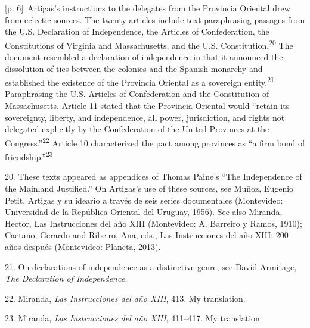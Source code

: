 \documentclass[10pt,a4paper]{article}
\begin{document}
{\scriptsize\color{gray} [p. 6]}\ Artigas’s instructions to the delegates from the Provincia Oriental drew from eclectic sources. The twenty articles include text paraphrasing passages from the U.S. Declaration of Independence, the Articles of Confederation, the Constitutions of Virginia and Massachusetts, and the U.S. Constitution.\nobreak\textsuperscript{20} The document resembled a declaration of independence in that it announced the dissolution of ties between the colonies and the Spanish monarchy and established the existence of the Provincia Oriental as a sovereign entity.\nobreak\textsuperscript{21} Paraphrasing the U.S. Articles of Confederation and the Constitution of Massachusetts, Article 11 stated that the Provincia Oriental would “retain its sovereignty, liberty, and independence, all power, jurisdiction, and rights not delegated explicitly by the Confederation of the United Provinces at the Congress.”\nobreak\textsuperscript{22} Article 10 characterized the pact among provinces as “a firm bond of friendship.”\nobreak\textsuperscript{23}\par{\small 20. These texts appeared as appendices of Thomas Paine’s “The Independence of the Mainland Justified.” On Artigas’s use of these sources, see Muñoz, Eugenio Petit, Artigas y su ideario a través de seis series documentales (Montevideo: Universidad de la República Oriental del Uruguay, 1956). See also Miranda, Hector, Las Instrucciones del año XIII (Montevideo: A. Barreiro y Ramos, 1910); Caetano, Gerardo and Ribeiro, Ana, eds., Las Instrucciones del año XIII: 200 años después (Montevideo: Planeta, 2013).\par}{\small 21. On declarations of independence as a distinctive genre, see David Armitage, \textit{The Declaration of Independence.}\par}{\small 22. Miranda, \textit{Las Instrucciones del año XIII}, 413. My translation.\par}{\small 23. Miranda, \textit{Las Instrucciones del año XIII}, 411–417. My translation.\par}
\end{document}

